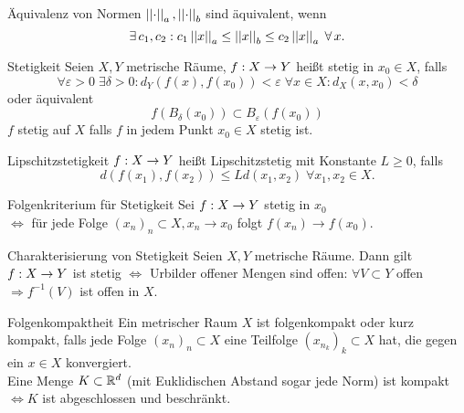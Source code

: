 \documentclass[main.tex]{subfiles}
\begin{document}
\begin{karte}{Äquivalenz von Normen}
    \( \left|\left|\cdot\right|\right|_a, \left|\left|\cdot\right|\right|_b \) sind äquivalent, wenn
    \[ \exists c_1, c_2: c_1\norm{x}_a \leq \norm{x}_b 
    \leq c_2\norm{x}_a \; \forall x. \]
\end{karte}

\begin{karte}{Stetigkeit}
    Seien \(X, Y \) metrische Räume, \(f : X \rightarrow Y\)
    heißt stetig in \(x_0 \in X\), falls 
    \[ \forall \varepsilon > 0 \; \exists \delta > 0:
    d_Y(f(x), f(x_0)) < \varepsilon \; \forall x \in X: 
    d_X(x, x_0) < \delta \]
    oder äquivalent 
    \[ f(B_\delta(x_0)) \subset B_\varepsilon(f(x_0)) \]
    \(f\) stetig auf \(X\) falls \(f\) in jedem Punkt 
    \(x_0 \in X\) stetig ist.
\end{karte}

\begin{karte}{Lipschitzstetigkeit}
    \( f : X \rightarrow Y \) heißt Lipschitzstetig 
    mit Konstante \( L \geq 0 \), falls 
    \[ d(f(x_1), f(x_2)) 
    \leq L d(x_1, x_2) \;\forall x_1, x_2 \in X. \]
\end{karte}

\begin{karte}{Folgenkriterium für Stetigkeit}
    Sei \( f : X \rightarrow Y \) stetig in \(x_0\)\\
    \( \Leftrightarrow \) für jede Folge 
    \( (x_n)_n \subset X, x_n \rightarrow x_0 \) 
    folgt \( f(x_n) \rightarrow f(x_0) \).
\end{karte}

\begin{karte}{Charakterisierung von Stetigkeit}
    Seien \( X, Y \) metrische Räume. Dann gilt \( f : X \rightarrow Y \)
    ist stetig \( \Leftrightarrow \) Urbilder offener Mengen sind offen:
    \( \forall V \subset Y \) offen \(\Rightarrow f^{-1}(V) \) ist offen in \( X \).
\end{karte}

\begin{karte}{Folgenkompaktheit}
    Ein metrischer Raum \( X \) ist folgenkompakt oder kurz kompakt, 
    falls jede Folge \((x_n)_n \subset X \) eine Teilfolge
    \( (x_{n_k})_k \subset X \) hat, die gegen ein \( x \in X \) konvergiert. \\
    Eine Menge \( K \subset \mathbb{R}^d \) (mit Euklidischen Abstand sogar jede
    Norm) ist kompakt \( \Leftrightarrow K \) ist abgeschlossen und
    beschränkt.
\end{karte}
\end{document}
